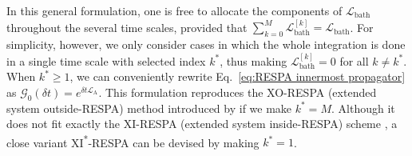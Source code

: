 \documentclass[
aip,
jcp,
reprint,
]{revtex4-1}
\newcommand{\Liu}{\mathcal{L}}
\begin{document}
In this general formulation, one is free to allocate the components of $\Liu_\mathrm{bath}$ throughout the several time scales, provided that $\sum_{k=0}^M \Liu_\mathrm{bath}^{[k]} = \Liu_\mathrm{bath}$.
For simplicity, however, we only consider cases in which the whole integration is done in a single time scale with selected index $k^\ast$, thus making $\Liu_\mathrm{bath}^{[k]} = 0$ for all $k \neq k^\ast$.
When $k^\ast \geq 1$, we can conveniently rewrite Eq.~\eqref{eq:RESPA innermost propagator} as $\mathcal{G}_0(\delta t) = e^{\delta t \Liu_\mathrm{A}}$.
This formulation reproduces the XO-RESPA (extended system outside-RESPA) method introduced by \citeauthor{Martyna_1996} \cite{Martyna_1996} if we make $k^\ast = M$.
Although it does not fit exactly the XI-RESPA (extended system inside-RESPA) scheme \cite{Martyna_1996}, a close variant XI\textsuperscript{*}-RESPA can be devised by making $k^\ast = 1$.
\end{document}
